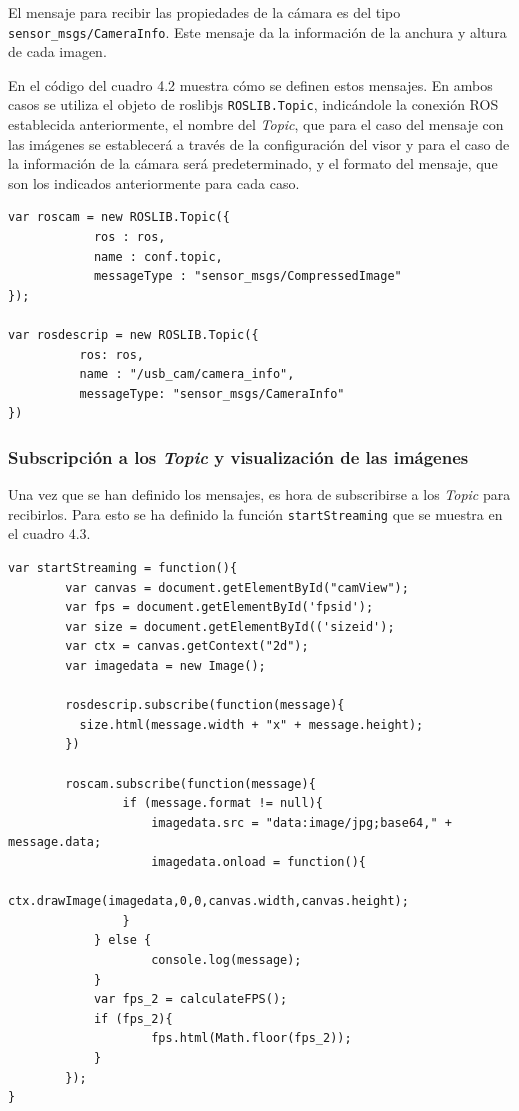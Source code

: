 El mensaje para recibir las propiedades de la cámara es del tipo \texttt{sensor\_msgs/CameraInfo}. Este mensaje da la información de la anchura y altura de cada imagen.

En el código del cuadro 4.2 muestra cómo se definen estos mensajes. En ambos casos se utiliza el objeto de roslibjs \texttt{ROSLIB.Topic}, indicándole la conexión ROS establecida anteriormente, el nombre del \textit{Topic}, que para el caso del mensaje con las imágenes se establecerá a través de la configuración del visor y para el caso de la información de la cámara será predeterminado, y el formato del mensaje, que son los indicados anteriormente para cada caso.

\begin{lstlisting}[caption= Definición de los mensajes ROS, label=cod.mensajescamviz]
var roscam = new ROSLIB.Topic({
            ros : ros,
            name : conf.topic,
            messageType : "sensor_msgs/CompressedImage"
});

var rosdescrip = new ROSLIB.Topic({
          ros: ros,
          name : "/usb_cam/camera_info",
          messageType: "sensor_msgs/CameraInfo"
})
\end{lstlisting}

\subsubsection{Subscripción a los \textit{Topic} y visualización de las imágenes}

Una vez que se han definido los mensajes, es hora de subscribirse a los \textit{Topic} para recibirlos. Para esto se ha definido la función \texttt{startStreaming} que se muestra en el cuadro 4.3.

\begin{lstlisting}[caption= Subscripción y visualización de las imágenes, label=cod.subscribecamviz]
var startStreaming = function(){
        var canvas = document.getElementById("camView");
        var fps = document.getElementById('fpsid');
        var size = document.getElementById(('sizeid');
        var ctx = canvas.getContext("2d");
        var imagedata = new Image();
        
        rosdescrip.subscribe(function(message){
          size.html(message.width + "x" + message.height);
        })
        
        roscam.subscribe(function(message){
        		if (message.format != null){
            		imagedata.src = "data:image/jpg;base64," + message.data;
            		imagedata.onload = function(){
              		ctx.drawImage(imagedata,0,0,canvas.width,canvas.height);
            	}
          	} else {
            		console.log(message);
          	}
          	var fps_2 = calculateFPS();
          	if (fps_2){
             		fps.html(Math.floor(fps_2));
          	}
      	});
}
\end{lstlisting}

